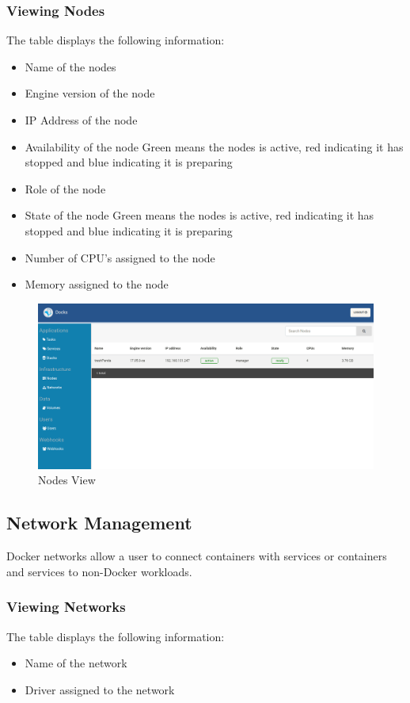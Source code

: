 \documentclass[]{article}
\providecommand{\tightlist}{%
	\setlength{\itemsep}{0pt}\setlength{\parskip}{0pt}}
\begin{document}
\subsubsection{Viewing Nodes}
The table displays the following information:
\begin{itemize}
	\tightlist
	\item Name of the nodes
	\item Engine version of the node
	\item IP Address of the node
	\item Availability of the node 
	Green means the nodes is active, 
	red indicating it has stopped and blue indicating it is preparing
	\item Role of the node
	\item State of the node 
	Green means the nodes is active, 
	red indicating it has stopped and blue indicating it is preparing
	\item Number of CPU's assigned to the node
	\item Memory assigned to the node
\end{itemize}

\begin{figure}[H]
	\centering
	\includegraphics[scale=0.4]{nodes.png}
	\caption{Nodes View}
\end{figure}

\subsection{Network Management}
Docker networks allow a user to connect containers with services or
containers and services to non-Docker workloads.

\subsubsection{Viewing Networks}
The table displays the following information:
\begin{itemize}
	\tightlist
	\item Name of the network
	\item Driver assigned to the network
\end{itemize}
\end{document}
